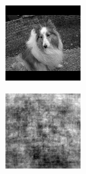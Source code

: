 \begin{figure}[H]
  \begin{subfigure}[t]{0.15\textwidth}
    \includegraphics[width=\linewidth]{img/one-trial/stimulus_2.png}
  \end{subfigure}
  \begin{subfigure}[t]{0.15\textwidth}
    \includegraphics[width=\linewidth]{img/one-trial/prediction_2_lr.png}

\end{subfigure}
\end{figure}
